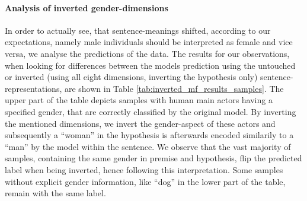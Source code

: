\paragraph*{Analysis of inverted gender-dimensions}
In order to actually see, that sentence-meanings shifted, according to our expectations, namely male individuals should be interpreted as female and vice versa, we analyse the predictions of the data. The results for our observations, when looking for differences between the models prediction using the untouched or inverted (using all eight dimensions, inverting the hypothesis only) sentence-representations, are shown in Table \ref{tab:inverted_mf_results_samples}. The upper part of the table depicts samples with human main actors having a specified gender, that are correctly classified by the original model. By inverting the mentioned dimensions, we invert the gender-aspect of these actors and subsequently a ``woman'' in the hypothesis is afterwards encoded similarily to a ``man'' by the model within the sentence. We observe that the vast majority of samples, containing the same gender in premise and hypothesis, flip the predicted label when being inverted, hence following this interpretation. Some samples without explicit gender information, like ``dog'' in the lower part of the table, remain with the same label. 
